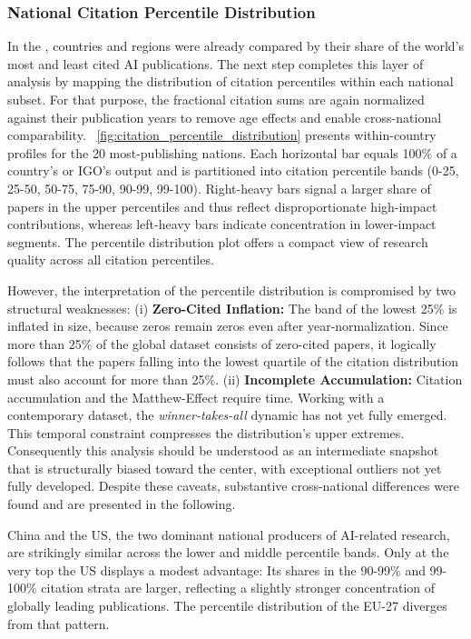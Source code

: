 \documentclass{article}
\begin{document}
	\subsubsection{National Citation Percentile Distribution}
	\label{citation_percentile_distribution}
	In the , countries and regions were already compared by their share of the world’s most and least cited AI publications. The next step completes this layer of analysis by mapping the distribution of citation percentiles within each national subset. For that purpose, the fractional citation sums are again normalized against their publication years to remove age effects and enable cross-national comparability. \figurename~\ref{fig:citation_percentile_distribution} presents within-country profiles for the 20 most-publishing nations. Each horizontal bar equals 100\% of a country’s or IGO's output and is partitioned into citation percentile bands (0-25, 25-50, 50-75, 75-90, 90-99, 99-100). Right-heavy bars signal a larger share of papers in the upper percentiles and thus reflect disproportionate high-impact contributions, whereas left-heavy bars indicate concentration in lower-impact segments. The percentile distribution plot offers a compact view of research quality across all citation percentiles.
	
	However, the interpretation of the percentile distribution is compromised by two structural weaknesses: (i) \textbf{Zero-Cited Inflation:} The band of the lowest 25\% is inflated in size, because zeros remain zeros even after year-normalization. Since more than 25\% of the global dataset consists of zero-cited papers, it logically follows that the papers falling into the lowest quartile of the citation distribution must also account for more than 25\%. (ii) \textbf{Incomplete Accumulation:} Citation accumulation and the Matthew-Effect require time. Working with a contemporary dataset, the \textit{winner-takes-all} dynamic has not yet fully emerged. This temporal constraint compresses the distribution’s upper extremes. Consequently this analysis should be understood as an intermediate snapshot that is structurally biased toward the center, with exceptional outliers not yet fully developed. Despite these caveats, substantive cross-national differences were found and are presented in the following.
	
	China and the US, the two dominant national producers of AI-related research, are strikingly similar across the lower and middle percentile bands. Only at the very top the US displays a modest advantage: Its shares in the 90-99\% and 99-100\% citation strata are larger, reflecting a slightly stronger concentration of globally leading publications. The percentile distribution of the EU-27 diverges from that pattern. 
	
\end{document}
